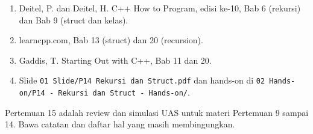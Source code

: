 \documentclass[a4paper]{article}
\begin{document}
\begin{enumerate}
\item Deitel, P. dan Deitel, H. C++ How to Program, edisi ke-10, Bab 6 (rekursi) dan Bab 9 (struct dan kelas).
\item learncpp.com, Bab 13 (struct) dan 20 (recursion).
\item Gaddis, T. Starting Out with C++, Bab 11 dan 20.
\item Slide \texttt{01 Slide/P14 Rekursi dan Struct.pdf} dan hands-on di \texttt{02 Hands-on/P14 - Rekursi dan Struct - Hands-on/}.
\end{enumerate}
\begin{Penting}
Pertemuan 15 adalah review dan simulasi UAS untuk materi Pertemuan 9 sampai 14. Bawa catatan dan daftar hal yang masih membingungkan.
\end{Penting}
\end{document}
